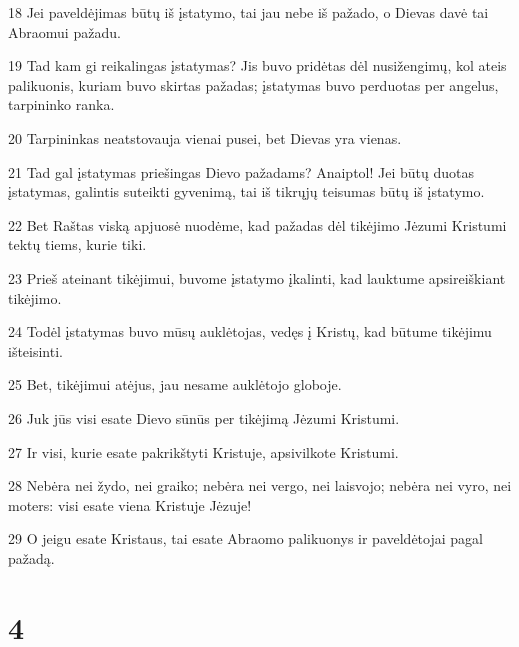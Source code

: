 \par 18 Jei paveldėjimas būtų iš įstatymo, tai jau nebe iš pažado, o Dievas davė tai Abraomui pažadu. 
\par 19 Tad kam gi reikalingas įstatymas? Jis buvo pridėtas dėl nusižengimų, kol ateis palikuonis, kuriam buvo skirtas pažadas; įstatymas buvo perduotas per angelus, tarpininko ranka. 
\par 20 Tarpininkas neatstovauja vienai pusei, bet Dievas yra vienas. 
\par 21 Tad gal įstatymas priešingas Dievo pažadams? Anaiptol! Jei būtų duotas įstatymas, galintis suteikti gyvenimą, tai iš tikrųjų teisumas būtų iš įstatymo. 
\par 22 Bet Raštas viską apjuosė nuodėme, kad pažadas dėl tikėjimo Jėzumi Kristumi tektų tiems, kurie tiki. 
\par 23 Prieš ateinant tikėjimui, buvome įstatymo įkalinti, kad lauktume apsireiškiant tikėjimo. 
\par 24 Todėl įstatymas buvo mūsų auklėtojas, vedęs į Kristų, kad būtume tikėjimu išteisinti. 
\par 25 Bet, tikėjimui atėjus, jau nesame auklėtojo globoje. 
\par 26 Juk jūs visi esate Dievo sūnūs per tikėjimą Jėzumi Kristumi. 
\par 27 Ir visi, kurie esate pakrikštyti Kristuje, apsivilkote Kristumi. 
\par 28 Nebėra nei žydo, nei graiko; nebėra nei vergo, nei laisvojo; nebėra nei vyro, nei moters: visi esate viena Kristuje Jėzuje! 
\par 29 O jeigu esate Kristaus, tai esate Abraomo palikuonys ir paveldėtojai pagal pažadą.


\chapter{4}


